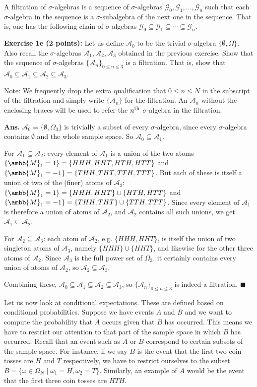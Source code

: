 \documentclass[12pt]{article} %
\newcommand{\mM}{\ambb{M}}
\newcommand{\cA}{\mathcal{A}}
\newcommand{\Ans}{\textbf{Ans. }}
\begin{document}
A filtration of $\sigma$-algebras is a sequence of $\sigma$-algebras
$\mathcal G_0, \mathcal G_1, \ldots, \mathcal G_n$ such that each
$\sigma$-algebra in the sequence is a $\sigma$-subalgebra of the next
one in the sequence. That is, one has the following chain of
$\sigma$-algebras $\mathcal G_0 \subseteq \mathcal G_1 \subseteq
\cdots \subseteq \mathcal G_n$.

\textbf{Exercise 1e (2 points):} Let us define $\cA_0$ to be the
trivial $\sigma$-algebra $\{\emptyset,\Omega\}$. Also recall the
$\sigma$-algebras $\cA_1, \cA_2, \cA_3$ obtained in the previous
exercise. Show that the sequence of $\sigma$-algebras
$\{\cA_n\}_{0\leq n \leq 3}$ is a filtration. That is, show that
$\cA_0 \subseteq \cA_1 \subseteq \cA_2 \subseteq \cA_3$.

Note: We frequently drop the extra qualification that $0 \leq n \leq
N$ in the subscript of the filtration and simply write $\{\cA_n\}$ for
the filtration. An $\cA_n$ without the enclosing braces will be used
to refer the $n^{\rm th}$ $\sigma$-algebra in the filtration.

\Ans $\cA_0 = \{\emptyset,\Omega_3\}$ is trivially a subset of every
$\sigma$-algebra, since every $\sigma$-algebra contains $\emptyset$ and
the whole sample space. So $\cA_0 \subseteq \cA_1$.

For $\cA_1 \subseteq \cA_2$: every element of $\cA_1$ is a union of
the two atoms $\{\mM_1=1\} = \{HHH,HHT,HTH,HTT\}$ and $\{\mM_1=-1\}
=\{THH,THT,TTH,TTT\}$. But each of these is itself a union of two of
the (finer) atoms of $\cA_2$: $\{\mM_1=1\} = \{HHH,HHT\}\cup
\{HTH,HTT\}$ and $\{\mM_1=-1\} = \{THH,THT\}\cup\{TTH,TTT\}$. Since
every element of $\cA_1$ is therefore a union of atoms of $\cA_2$, and
$\cA_2$ contains all such unions, we get $\cA_1 \subseteq \cA_2$.

For $\cA_2 \subseteq \cA_3$: each atom of $\cA_2$, e.g.
$\{HHH,HHT\}$, is itself the union of two singleton atoms of $\cA_3$,
namely $\{HHH\}\cup\{HHT\}$, and likewise for the other three atoms of
$\cA_2$. Since $\cA_3$ is the full power set of $\Omega_3$, it
certainly contains every union of atoms of $\cA_2$, so
$\cA_2 \subseteq \cA_3$.

Combining these, $\cA_0 \subseteq \cA_1 \subseteq \cA_2 \subseteq
\cA_3$, so $\{\cA_n\}_{0\leq n \leq 3}$ is indeed a filtration.
\hfill$\blacksquare$

Let us now look at conditional expectations. These are defined based
on conditional probabilities. Suppose we have events $A$ and $B$ and
we want to compute the probability that $A$ occurs given that $B$ has
occurred. This means we have to restrict our attention to that part of
the sample space in which $B$ has occurred. Recall that an event such
as $A$ or $B$ correspond to certain subsets of the sample space. For
instance, if we say $B$ is the event that the first two coin tosses
are $H$ and $T$ respectively, we have to restrict ourselves to the
subset $B = \{\omega \in \Omega_N \mid \omega_1 = H, \omega_2 = T\}$.
Similarly, an example of $A$ would be the event that the first three
coin tosses are $HTH$.
\end{document}
